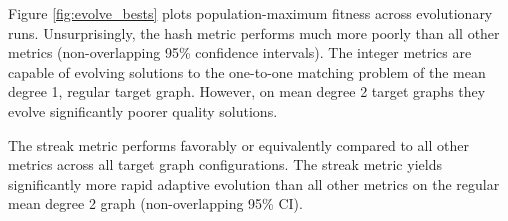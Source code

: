 Figure \ref{fig:evolve_bests} plots population-maximum fitness across evolutionary runs.
Unsurprisingly, the hash metric performs much more poorly than all other metrics (non-overlapping 95\% confidence intervals).
The integer metrics are capable of evolving solutions to the one-to-one matching problem of the mean degree 1, regular target graph.
However, on mean degree 2 target graphs they evolve significantly poorer quality solutions.

The streak metric performs favorably or equivalently compared to all other metrics across all target graph configurations.
The streak metric yields significantly more rapid adaptive evolution than all other metrics on the regular mean degree 2 graph (non-overlapping 95\% CI).


